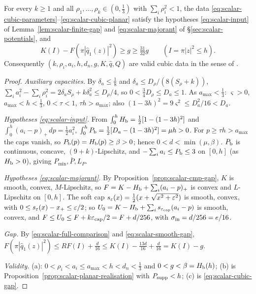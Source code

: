 \begin{proposition}\label{prop:scalar-cubic-data}
For every $k\ge1$ and all $\rho_1,\dots,\rho_k\in(0,\frac13)$ with $\sum_i\rho_i^2<1$, the data
\eqref{eq:scalar-cubic-parameters}--\eqref{eq:scalar-cubic-planar} satisfy the hypotheses \eqref{eq:scalar-input} of
Lemma~\ref{lem:scalar-finite-gap} and \eqref{eq:scalar-majorant} of \S\ref{sec:scalar-potentials}, and
\begin{equation}\label{eq:scalar-cubic-gap}
 K(I)-F(\pi|\widehat q_1(z)|^2)\ge g\ge\tfrac{31}{32}g\qquad(I=\pi|z|^2\le h).
\end{equation}
Consequently $(k,\rho_i,a_i,h,d_n,g,K,\widehat q,Q)$ are valid cubic data in the sense of .
{\normalfont {}}
\end{proposition}

\begin{proof}
\emph{Auxiliary capacities.} By $\delta_a\le\frac18$ and $\delta_a\le D_\rho/(8(S_\rho+k))$, $\sum_ia_i^2-\sum_i\rho_i^2=2\delta_aS_\rho+k\delta_a^2\le D_\rho/4$, so $0<\frac34D_\rho\le D_a\le1$. As $a_{\max}<\frac13$: $\varsigma>0$, $a_{\max}<h<\frac13$, $0<\tau<1$, $\tau h>a_{\max}$; also $(1-3h)^2=9\varsigma^2\le D_a^2/16<D_a$.

\emph{Hypotheses \eqref{eq:scalar-input}.} From $\int_0^hH_{\mathrm b}=\frac12[1-(1-3h)^2]$ and $\int_0^h(a_i-p)_+\,dp=\frac12a_i^2$, $\int_0^hP_{\mathrm b}=\frac12[D_a-(1-3h)^2]=\mu h>0$. For $p\ge\tau h>a_{\max}$ the caps vanish, so $P_{\mathrm b}(p)=H_{\mathrm b}(p)\ge\beta>0$; hence $0<d<\min(\mu,\beta)$. $P_{\mathrm b}$ is continuous, concave, $(9+k)$-Lipschitz, and $-\sum_ia_i\le P_{\mathrm b}\le3$ on $[0,h]$ (as $H_{\mathrm b}>0$), giving $P_{\min},\bar P,L_P$.

\emph{Hypotheses \eqref{eq:scalar-majorant}.} By Proposition~\ref{prop:scalar-cmp-gap}, $K$ is smooth, convex, $M$-Lipschitz, so $F=K-H_{\mathrm b}+\sum_i(a_i-p)_+$ is convex and $L$-Lipschitz on $[0,h]$. The soft cap $s_\varepsilon(x)=\frac12(x+\sqrt{x^2+\varepsilon^2})$ is smooth, convex, with $0\le s_\varepsilon(x)-x_+\le\varepsilon/2$; so $U_0=K-H_{\mathrm b}+\sum_is_{\varepsilon_{\rm cap}}(a_i-p)$ is smooth, convex, and $F\le U_0\le F+k\varepsilon_{\rm cap}/2=F+d/256$, with $\sigma_{\rm in}=d/256=e/16$.

\emph{Gap.} By \eqref{eq:scalar-full-comparison} and \eqref{eq:scalar-smooth-gap}, $F(\pi|\widehat q_1(z)|^2)\le RF(I)+\tfrac d{16}\le K(I)-\tfrac{13d}{16}+\tfrac d{16}=K(I)-g$.

\emph{Validity.} (a): $0<\rho_i<a_i\le a_{\max}<h<d_n<\frac13$ and $0<g<\beta=H_{\mathrm b}(h)$; (b) is Proposition~\ref{prop:scalar-planar-realisation} with $P_{\rm supp}<h$; (c) is \eqref{eq:scalar-cubic-gap}.
\end{proof}

